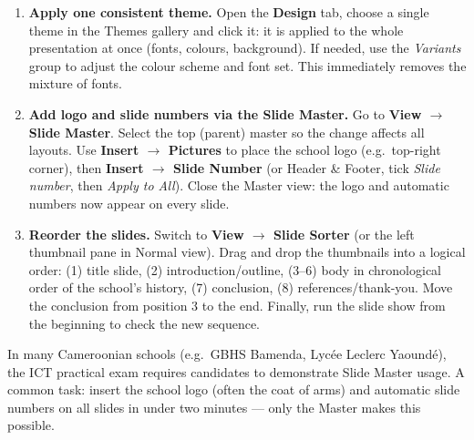 \documentclass[11pt]{article}
\begin{document}
\begin{corrige}
\begin{enumerate}
\item \textbf{Apply one consistent theme.}
Open the \textbf{Design} tab, choose a single theme in the Themes gallery and click it: it is applied to the whole presentation at once (fonts, colours, background). If needed, use the \emph{Variants} group to adjust the colour scheme and font set. This immediately removes the mixture of fonts.
\item \textbf{Add logo and slide numbers via the Slide Master.}
Go to \textbf{View $\rightarrow$ Slide Master}. Select the top (parent) master so the change affects all layouts. Use \textbf{Insert $\rightarrow$ Pictures} to place the school logo (e.g.\ top-right corner), then \textbf{Insert $\rightarrow$ Slide Number} (or Header \& Footer, tick \emph{Slide number}, then \emph{Apply to All}). Close the Master view: the logo and automatic numbers now appear on every slide.
\item \textbf{Reorder the slides.}
Switch to \textbf{View $\rightarrow$ Slide Sorter} (or the left thumbnail pane in Normal view). Drag and drop the thumbnails into a logical order: (1) title slide, (2) introduction/outline, (3--6) body in chronological order of the school's history, (7) conclusion, (8) references/thank-you. Move the conclusion from position 3 to the end. Finally, run the slide show from the beginning to check the new sequence.
\end{enumerate}
\begin{savaistu}
In many Cameroonian schools (e.g.\ GBHS Bamenda, Lycée Leclerc Yaoundé), the ICT practical exam requires candidates to demonstrate Slide Master usage. A common task: insert the school logo (often the coat of arms) and automatic slide numbers on all slides in under two minutes — only the Master makes this possible.
\end{savaistu}
\end{corrige}
\end{document}
